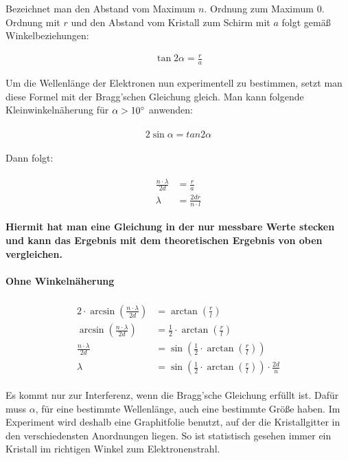 Bezeichnet man den Abstand vom Maximum $n.$ Ordnung zum Maximum $0.$ Ordnung mit $r$ und den Abstand vom Kristall zum Schirm mit $a$ folgt gemäß Winkelbeziehungen:

\begin{align}
	\tan{2\alpha} = \frac{r}{a}
\end{align}

Um die Wellenlänge der Elektronen nun experimentell zu bestimmen, setzt man diese Formel mit der Bragg'schen Gleichung gleich. Man kann folgende Kleinwinkelnäherung für $\alpha > 10\degree$ anwenden:

\begin{align}
\begin{split}
	2\sin{\alpha} = tan{2\alpha}
\end{split}
\end{align}

\noindent Dann folgt:

\begin{align}
\begin{split}
	\frac{n\cdot\lambda}{2d} &= \frac{r}{a} \\
	\lambda &= \frac{2dr}{n\cdot l}
\end{split}
\end{align}

\noindent \textbf{Hiermit hat man eine Gleichung in der nur messbare Werte stecken und kann das Ergebnis mit dem theoretischen Ergebnis von oben vergleichen.}

\paragraph{Ohne Winkelnäherung}

\begin{align}
\begin{split}
	2\cdot\arcsin(\frac{n\cdot \lambda}{2d}) &= \arctan(\frac{r}{l})  \\
	\arcsin(\frac{n\cdot \lambda}{2d}) &= \frac{1}{2}\cdot\arctan(\frac{r}{l}) \\
	\frac{n\cdot \lambda}{2d} &= \sin(\frac{1}{2}\cdot\arctan(\frac{r}{l})) \\
	\lambda &= \sin(\frac{1}{2}\cdot\arctan(\frac{r}{l}))\cdot \frac{2d}{n}
\end{split}
\end{align}

\begin{NiceToKnow}
Es kommt nur zur Interferenz, wenn die Bragg'sche Gleichung erfüllt ist. Dafür muss $\alpha$, für eine bestimmte Wellenlänge, auch eine bestimmte Größe haben. Im Experiment wird deshalb eine Graphitfolie benutzt, auf der die Kristallgitter in den verschiedensten Anordnungen liegen. So ist statistisch gesehen immer ein Kristall im richtigen Winkel zum Elektronenstrahl.
\end{NiceToKnow}


